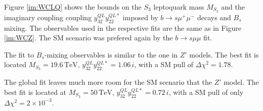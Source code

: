 \documentclass[11pt, a4paper]{article}
\begin{document}
Figure \ref{im:WCLQ} shows the bounds on the $S_3$ leptoquark mass $M_{S_3}$ and the imaginary coupling coupling $y^{QL}_{32} y^{QL*}_{22}$  imposed by $b\to s \mu^+ \mu^-$ decays and $B_s$ mixing. The observables used in the respective fits are the same as in Figure \ref{im:WCZ}. The SM scenario was prefered again by the $b\to s\mu\mu$ fit.

The fit to $B_s$-mixing observables is similar to the one in $Z'$ models. The best fit is located $M_{S_3}= 19.6\,\mathrm{TeV}$, $y_{32}^{QL} y_{22}^{QL*} = 1.06\,i$, with a SM pull of $\Delta\chi^2 = 1.78$. 

The global fit leaves much more room for the SM scenario that the $Z'$ model. The best fit is located at $M_{S_3} = 50\,\mathrm{TeV}$, $y_{32}^{QL} y_{22}^{QL*} = 0.72\,i$, with a SM pull of only $\Delta\chi^2 = 2\times10^{-3}$.
\end{document}
